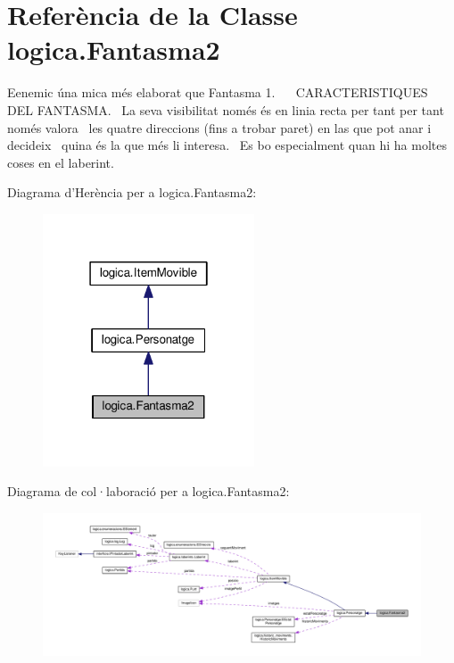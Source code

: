 \hypertarget{classlogica_1_1_fantasma2}{\section{Referència de la Classe logica.\+Fantasma2}
\label{classlogica_1_1_fantasma2}
}


Eenemic úna mica més elaborat que Fantasma 1.~\newline
~\newline
C\+A\+R\+A\+C\+T\+E\+R\+I\+S\+T\+I\+Q\+U\+E\+S D\+E\+L F\+A\+N\+T\+A\+S\+M\+A.~\newline
La seva visibilitat només és en linia recta per tant per tant només valora~\newline
les quatre direccions (fins a trobar paret) en las que pot anar i decideix~\newline
quina és la que més li interesa.~\newline
Es bo especialment quan hi ha moltes coses en el laberint.  




Diagrama d'Herència per a logica.\+Fantasma2\+:\nopagebreak
\begin{figure}[H]
\begin{center}
\leavevmode
\includegraphics[width=178pt]{classlogica_1_1_fantasma2__inherit__graph}
\end{center}
\end{figure}


Diagrama de col·laboració per a logica.\+Fantasma2\+:
\nopagebreak
\begin{figure}[H]
\begin{center}
\leavevmode
\includegraphics[width=350pt]{classlogica_1_1_fantasma2__coll__graph}
\end{center}
\end{figure}
